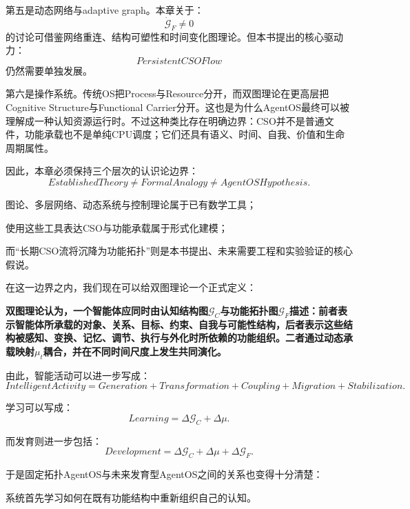 第五是动态网络与adaptive graph。本章关于：
\[
\dot{\mathcal G}_F\neq0
\]
的讨论可借鉴网络重连、结构可塑性和时间变化图理论。但本书提出的核心驱动力：
\[
PersistentCSOFlow
\]
仍然需要单独发展。

第六是操作系统。传统OS把Process与Resource分开，而双图理论在更高层把Cognitive Structure与Functional Carrier分开。这也是为什么AgentOS最终可以被理解成一种认知资源运行时。不过这种类比存在明确边界：CSO并不是普通文件，功能承载也不是单纯CPU调度；它们还具有语义、时间、自我、价值和生命周期属性。

因此，本章必须保持三个层次的认识论边界：
\[
\boxed{
EstablishedTheory
\neq
FormalAnalogy
\neq
AgentOSHypothesis.
}
\]

图论、多层网络、动态系统与控制理论属于已有数学工具；

使用这些工具表达CSO与功能承载属于形式化建模；

而“长期CSO流将沉降为功能拓扑”则是本书提出、未来需要工程和实验验证的核心假说。

在这一边界之内，我们现在可以给双图理论一个正式定义：

\begin{definition*}
\bfseries
双图理论认为，一个智能体应同时由认知结构图$\mathcal G_C$与功能拓扑图$\mathcal G_F$描述：前者表示智能体所承载的对象、关系、目标、约束、自我与可能性结构，后者表示这些结构被感知、变换、记忆、调节、执行与外化时所依赖的功能组织。二者通过动态承载映射$\mu_t$耦合，并在不同时间尺度上发生共同演化。
\end{definition*}

由此，智能活动可以进一步写成：
\[
\boxed{
IntelligentActivity
=
Generation
+
Transformation
+
Coupling
+
Migration
+
Stabilization.
}
\]

学习可以写成：
\[
\boxed{
Learning
=
\Delta\mathcal G_C
+
\Delta\mu.
}
\]

而发育则进一步包括：
\[
\boxed{
Development
=
\Delta\mathcal G_C
+
\Delta\mu
+
\Delta\mathcal G_F.
}
\]

于是固定拓扑AgentOS与未来发育型AgentOS之间的关系也变得十分清楚：

\begin{statementbox}
\centering
{}
\end{statementbox}

系统首先学习如何在既有功能结构中重新组织自己的认知。

